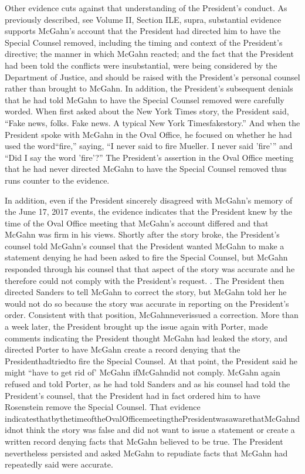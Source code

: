 Other evidence cuts against that understanding of the President's conduct.
As previously described, see Volume II, Section ILE, supra, substantial evidence supports McGahn's account that the President had directed him to have the Special Counsel removed, including the timing and context of the President's directive;
the manner in which McGahn reacted;
and the fact that the President had been told the conflicts were insubstantial, were being considered by the Department of Justice, and should be raised with the President's personal counsel rather than brought to McGahn.
In addition, the President's subsequent denials that he had told McGahn to have the Special Counsel removed were carefully worded.
When first asked about the New York Times story, the President said, “Fake news, folks.
Fake news.
A typical New York Timesfakestory.” And when the President spoke with McGahn in the Oval Office, he focused on whether he had used the word“fire,” saying, “I never said to fire Mueller.
I never said 'fire'” and “Did I say the word 'fire'?” The President's assertion in the Oval Office meeting that he had never directed McGahn to have the Special Counsel removed thus runs counter to the evidence.

In addition, even if the President sincerely disagreed with McGahn's memory of the June 17, 2017 events, the evidence indicates that the President knew by the time of the Oval Office
meeting that McGahn's account differed and that McGahn was firm in his views.
Shortly after the story broke, the President's counsel told McGahn's counsel that the President wanted McGahn to make a statement denying he had been asked to fire the Special Counsel, but McGahn responded through his counsel that that aspect of the story was accurate and he therefore could not comply with the President's request. .
The President then directed Sanders to tell McGahn to correct the story, but McGahn told her he would not do so because the story was accurate in reporting on the President's order.
Consistent with that position, McGahnneverissued a correction.
More than a week later, the President brought up the issue again with Porter, made comments indicating the President thought McGahn had leaked the story, and directed Porter to have McGahn create a record denying that the Presidenthadtriedto fire the Special Counsel.
At that point, the President said he might “have to get rid of' McGahn ifMcGahndid not comply.
McGahn again refused and told Porter, as he had told Sanders and as his counsel had told the President's counsel, that the President had in fact ordered him to have Rosenstein remove the Special Counsel.
That evidence indicatesthatbythetimeoftheOvalOfficemeetingthePresidentwasawarethatMcGahndidnot think the story was false and did not want to issue a statement or create a written record denying facts that McGahn believed to be true.
The President nevertheless persisted and asked McGahn to repudiate facts that McGahn had repeatedly said were accurate.

